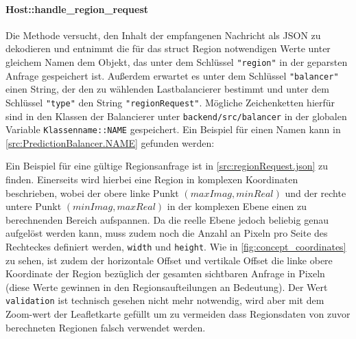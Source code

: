 \begin{figure}
	
\end{figure}

\paragraph{Host::handle\_region\_request}\label{cls:Host::handle_region_request}

Die Methode versucht, den Inhalt der empfangenen Nachricht als JSON zu dekodieren und entnimmt die für das struct Region
notwendigen Werte unter gleichem Namen dem Objekt, das unter dem Schlüssel \verb|"region"| in der geparsten Anfrage gespeichert ist.
Außerdem erwartet es unter dem Schlüssel \verb|"balancer"| einen String, der den zu wählenden Lastbalancierer bestimmt und unter dem Schlüssel \verb|"type"| den String \verb|"regionRequest"|.
Mögliche Zeichenketten hierfür sind in den Klassen der Balancierer unter \verb|backend/src/balancer| in der globalen Variable
\verb|Klassenname::NAME| gespeichert.
Ein Beispiel für einen Namen kann in \autoref{src:PredictionBalancer.NAME} gefunden werden:

\begin{figure}[h]
	
\end{figure}

Ein Beispiel für eine gültige Regionsanfrage ist in \autoref{src:regionRequest.json} zu finden.
Einerseits wird hierbei eine Region in komplexen Koordinaten beschrieben, wobei der obere linke Punkt $(maxImag, minReal)$
und der rechte untere Punkt $(minImag, maxReal)$ in der komplexen Ebene einen zu berechnenden Bereich aufspannen.
Da die reelle Ebene jedoch beliebig genau aufgelöst werden kann, muss zudem noch die Anzahl an Pixeln
pro Seite des Rechteckes definiert werden, \verb|width| und \verb|height|.
Wie in \autoref{fig:concept_coordinates} zu sehen, ist zudem der horizontale Offset und vertikale Offset
die linke obere Koordinate der Region bezüglich der gesamten sichtbaren Anfrage in Pixeln (diese Werte
gewinnen in den Regionsaufteilungen an Bedeutung).
Der Wert \verb|validation| ist technisch gesehen nicht mehr notwendig, wird aber mit dem Zoom-wert der Leafletkarte gefüllt
um zu vermeiden dass Regionsdaten von zuvor berechneten Regionen falsch verwendet werden.

